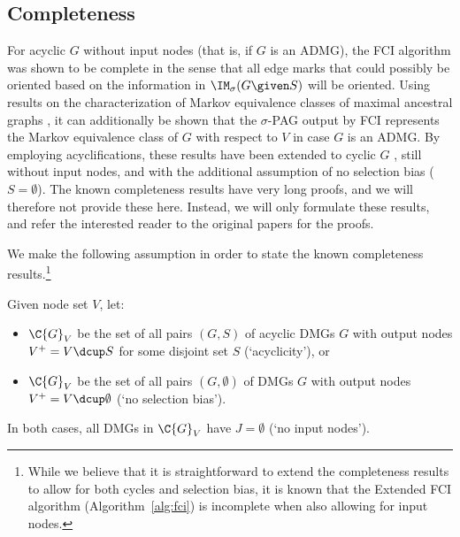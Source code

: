 \subsection{Completeness}

For acyclic $G$ without input nodes (that is, if $G$ is an ADMG), the FCI algorithm was shown to be complete \cite{Zhang2008_AI} in the sense that all edge marks that could possibly be oriented based on the information in $\IM_\sigma(G \given S)$ will be oriented.
Using results on the characterization of Markov equivalence classes of maximal ancestral graphs \cite{Ali++2005}, it can additionally be shown that the $\sigma$-PAG output by FCI represents the Markov equivalence class of $G$ with respect to $V$ in case $G$ is an ADMG.
By employing acyclifications, these results have been extended to cyclic $G$ \cite{MooijClaassen_UAI_20}, still without input nodes, and with the additional assumption of no selection bias ($S = \emptyset$).
The known completeness results have very long proofs, and we will therefore not provide these here.
Instead, we will only formulate these results, and refer the interested reader to the original papers for the proofs.


We make the following assumption in order to state the known completeness results.\footnote{While we believe that it is straightforward to extend the completeness results to allow for both cycles and selection bias, it is known that the Extended FCI algorithm (Algorithm~\ref{alg:fci}) is incomplete when also allowing for input nodes.}
\begin{Ass}\label{ass:fci_completeness_assumption}
  Given node set $V$, let:
  \begin{itemize}
    \item $\C{G}_V$ be the set of all pairs $(G,S)$ of acyclic DMGs $G$ with output nodes $V^+ = V \dcup S$ for some disjoint set $S$ (`acyclicity'), or
    \item $\C{G}_V$ be the set of all pairs $(G,\emptyset)$ of DMGs $G$ with output nodes $V^+ = V \dcup \emptyset$ (`no selection bias').
  \end{itemize}
  In both cases, all DMGs in $\C{G}_V$ have $J = \emptyset$ (`no input nodes').
\end{Ass}

